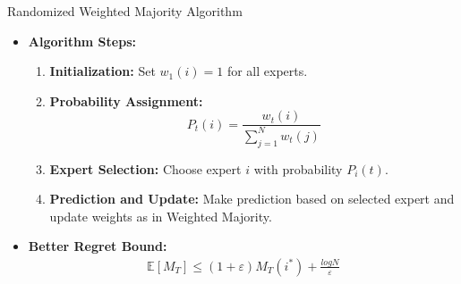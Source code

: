 \documentclass{beamer}
\begin{document}


\begin{frame}{Randomized Weighted Majority Algorithm}
  \begin{itemize}
    \item \textbf{Algorithm Steps:}
          \begin{enumerate}
            \item \textbf{Initialization:} Set $w_1(i) = 1$ for all experts.
            \item \textbf{Probability Assignment:}
                  \[
                    P_t(i) = \frac{w_t(i)}{\sum_{j=1}^{N} w_t(j)}
                  \]
            \item \textbf{Expert Selection:} Choose expert $i$ with probability $P_i(t)$.
            \item \textbf{Prediction and Update:} Make prediction based on selected expert and update weights as in Weighted Majority.
          \end{enumerate}
    \item \textbf{Better Regret Bound:} \\
          \begin{align*}
            \mathbb{E}[M_T] \leq (1+\varepsilon)M_T(i^*) + \frac{log N}{\varepsilon}
          \end{align*}
  \end{itemize}
\end{frame}
\end{document}
